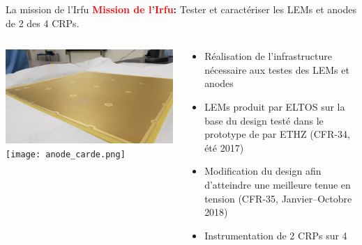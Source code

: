     \begin{frame}{La mission de l'Irfu}
        \centering \textbf{\textcolor{red}{Mission de l'Irfu}: }Tester et caractériser les LEMs et anodes de 2 des 4 CRPs.\\\vfill
    	\begin{scriptsize}
        	\begin{columns}
            	\begin{column}{0.5\textwidth}
                	\includegraphics[width=\textwidth]{./pictures/LEM.png}\\
                   	\texttt{[image: anode\_carde.png]}
            	\end{column}
       	        \begin{column}{0.5\textwidth}
           	        \begin{itemize}
               	        \item Réalisation de l'infrastructure nécessaire aux testes des LEMs et anodes
               	        \item LEMs produit par ELTOS sur la base du design testé dans le prototype de \threeL{} par ETHZ (CFR-34, été 2017)
               	        \item Modification du design afin d'atteindre une meilleure tenue en tension (CFR-35, Janvier--Octobre 2018)
               	        \item Instrumentation de 2 CRPs sur 4
           	        \end{itemize}
       	        \end{column}
        	\end{columns}
   		\end{scriptsize}
    \end{frame}

